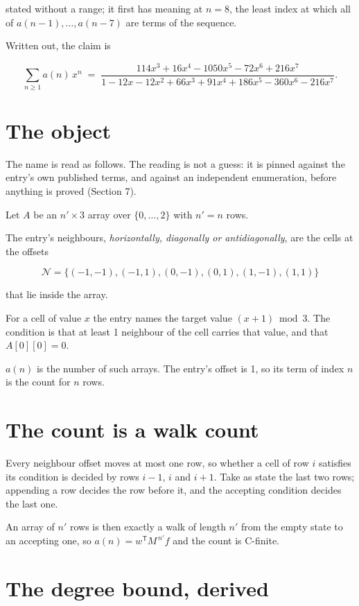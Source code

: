 \documentclass[11pt]{article}
\theoremstyle{definition}
\begin{document}
stated without a range; it first has meaning at $n = 8$, the least index at which all of $a(n-1),\dots,a(n-7)$ are terms of the sequence.

Written out, the claim is

\[\sum_{n \ge 1} a(n)\,x^n \;=\; \frac{114x^{3} + 16x^{4} - 1050x^{5} - 72x^{6} + 216x^{7}}{1 - 12x - 12x^{2} + 66x^{3} + 91x^{4} + 186x^{5} - 360x^{6} - 216x^{7}}.\]

\section{The object}

The name is read as follows. The reading is not a guess: it is pinned against the entry's own published terms, and against an independent enumeration, before anything is proved (Section 7).

Let $A$ be an $n' \times 3$ array over $\{0,\dots,2\}$ with $n' = n$ rows.

The entry's neighbours, {\itshape horizontally, diagonally or antidiagonally}, are the cells at the offsets

\[\mathcal{N} = \{(-1,-1), (-1,1), (0,-1), (0,1), (1,-1), (1,1)\}\]

that lie inside the array.

For a cell of value $x$ the entry names the target value $(x + 1) \bmod 3$. The condition is that at least 1 neighbour of the cell carries that value, and that $A[0][0] = 0$.

$a(n)$ is the number of such arrays. The entry's offset is 1, so its term of index $n$ is the count for $n$ rows.

\section{The count is a walk count}

Every neighbour offset moves at most one row, so whether a cell of row $i$ satisfies its condition is decided by rows $i-1$, $i$ and $i+1$. Take as state the last two rows; appending a row decides the row before it, and the accepting condition decides the last one.

An array of $n'$ rows is then exactly a walk of length $n'$ from the empty state to an accepting one, so $a(n) = w^{\mathsf T}M^{\,n'}f$ and the count is C-finite.

\section{The degree bound, derived}
\end{document}
